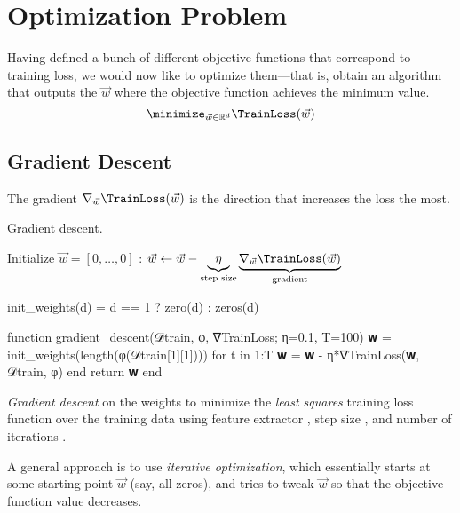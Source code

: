 \section{Optimization Problem} %
\label{sec:optimization_problem}
Having defined a bunch of different objective functions that correspond to training loss, 
we would now like to optimize them---that is, obtain an algorithm that outputs the $\vec{w}$ where the objective function achieves the minimum value.
\[
    \minimize_{\vec{w} \in \mathbb{R}^d} \TrainLoss(\vec{w})
\]

\subsection{Gradient Descent} %
\label{sub:gradient_descent}


\begin{example}
     The gradient $\nabla_{\vec{w}}\TrainLoss(\vec{w})$ is the direction that increases the loss the most.
\end{example}

\begin{algorithm}[ht]
\caption{\label{alg:gd}Gradient descent.}
\begin{algorithmic}
    \State Initialize $\vec{w}=[0,\ldots,0]$
    :
        \State $\vec{w} \leftarrow \vec{w} - \underbrace{\eta}_{\text{step size}} \underbrace{\nabla_{\vec{w}}\TrainLoss(\vec{w})}_{\text{gradient}}$
    \EndFor
\EndFunction
\end{algorithmic}
\end{algorithm}
\begin{algorithm}
\begin{juliaverbatim}
init_weights(d) = d == 1 ? zero(d) : zeros(d)

function gradient_descent(𝒟train, φ, ∇TrainLoss; η=0.1, T=100)
    𝐰 = init_weights(length(φ(𝒟train[1][1])))
    for t in 1:T
        𝐰 = 𝐰 - η*∇TrainLoss(𝐰, 𝒟train, φ)
    end
    return 𝐰
end
\end{juliaverbatim}

\caption{
    \label{alg:gradient_descent}
    \textit{Gradient descent} on the weights  to minimize the \textit{least squares} training loss function over the training data  using feature extractor , step size , and number of iterations .
}
\end{algorithm}
A general approach is to use \textit{iterative optimization}, which essentially starts at some starting point $\vec{w}$ (say, all zeros),
and tries to tweak $\vec{w}$ so that the objective function value decreases.

